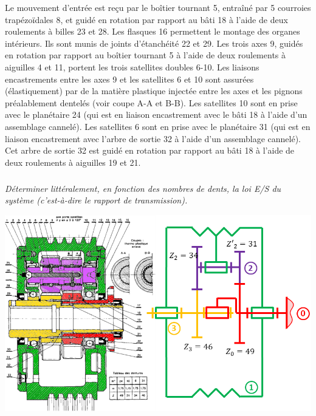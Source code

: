 \documentclass[10pt,fleqn]{article} %
\begin{document}
\begin{multicols}{2}
Le mouvement d’entrée est reçu par le boîtier tournant 5, entraîné par 5 courroies trapézoïdales 8, et guidé en rotation par rapport au bâti 18 à l’aide de deux roulements à billes 23 et 28. 
Les flasques 16 permettent le montage des organes intérieurs. Ils sont munis de joints d’étanchéité 22 et 29. 
Les trois axes 9, guidés en rotation par rapport au boîtier tournant 5 à l’aide de deux roulements à aiguilles 4 et 11, portent les trois satellites doubles 6-10.
Les liaisons encastrements entre les axes 9 et les satellites 6 et 10 sont assurées (élastiquement) par de la matière plastique injectée entre les axes et les pignons préalablement dentelés (voir coupe A-A et B-B). 
Les satellites 10 sont en prise avec le planétaire 24 (qui est en liaison encastrement avec le bâti 18 à l’aide d’un assemblage cannelé).
Les satellites 6 sont en prise avec le planétaire 31 (qui est en liaison encastrement avec l’arbre de sortie 32 à l’aide d’un assemblage cannelé). Cet arbre de sortie 32 est guidé en rotation par rapport au bâti 18 à l’aide de deux roulements à aiguilles 19 et 21.



\subparagraph{}
\textit{Déterminer littéralement, en fonction des nombres de dents, la loi E/S du système (c'est-à-dire le rapport de transmission).}


%
%
%

\begin{center}
\includegraphics[width=\linewidth]{images/redex_04}
\end{center}





\end{multicols}
\end{document}
